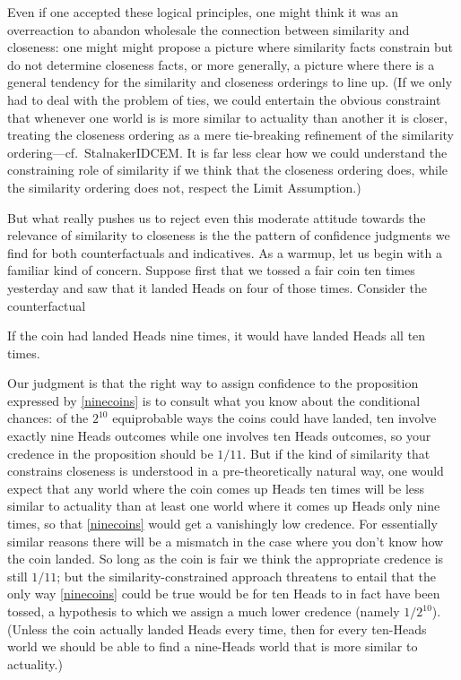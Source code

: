 \documentclass[leqno, 11pt, a5paper, openany]{article}
\begin{document}
Even if one accepted these logical principles, one might think it was an overreaction to abandon wholesale the connection between similarity and closeness: one might might propose a picture where similarity facts constrain but do not determine closeness facts, or more generally, a picture where there is a general tendency for the similarity and closeness orderings to line up. (If we only had to deal with the problem of ties, we could entertain the obvious constraint that whenever one world is is more similar to actuality than another it is closer, treating the closeness ordering as a mere tie-breaking refinement of the similarity ordering---cf.~StalnakerIDCEM. It is far less clear how we could understand the constraining role of similarity if we think that the closeness ordering does, while the similarity ordering does not, respect the Limit Assumption.) 

But what really pushes us to reject even this moderate attitude towards the relevance of similarity to closeness is the the pattern of confidence judgments we find for both counterfactuals and indicatives. As a warmup, let us begin with a familiar kind of concern. Suppose first that we tossed a fair coin ten times yesterday and saw that it landed Heads on four of those times. Consider the counterfactual
\begin{prop}
\nitem \label{ninecoins}
  If the coin had landed Heads nine times, it would have landed Heads all ten times.
\end{prop}
Our judgment is that the right way to assign confidence to the proposition expressed by \ref{ninecoins} is to consult what you know about the conditional chances: of the $2^{10}$ equiprobable ways the coins could have landed, ten involve exactly nine Heads outcomes while one involves ten Heads outcomes, so your credence in the proposition should be $1/11$. But if the kind of similarity that constrains closeness is understood in a pre-theoretically natural way, one would expect that any world where the coin comes up Heads ten times will be less similar to actuality than at least one world where it comes up Heads only nine times, so that \ref{ninecoins} would get a vanishingly low credence. For essentially similar reasons there will be a mismatch in the case where you don't know how the coin landed. So long as the coin is fair we think the appropriate credence is still $1/11$; but the similarity-constrained approach threatens to entail that the only way \ref{ninecoins} could be true would be for ten Heads to in fact have been tossed, a hypothesis to which we assign a much lower credence (namely $1/2^{10}$). (Unless the coin actually landed Heads every time, then for every ten-Heads world we should be able to find a nine-Heads world that is more similar to actuality.)
\end{document}
